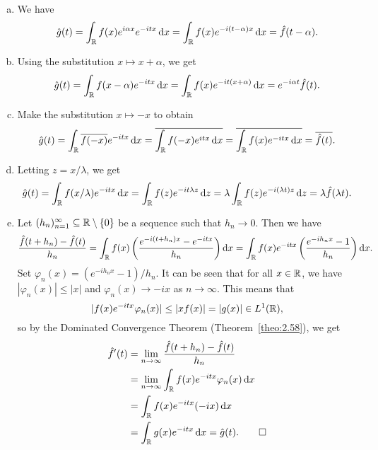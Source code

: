 \begin{pf}~
    \begin{enumerate}[(a)]
        \item We have 
        \[ \hat g(t) = \int_{\mathbb{R}} f(x) e^{i\alpha x} e^{-itx}\,\mathrm{d} x = 
        \int_{\mathbb{R}} f(x) e^{-i(t-\alpha)x}\,\mathrm{d} x = \hat f(t - \alpha). \] 
        \item Using the substitution $x \mapsto x + \alpha$, we get 
        \[ \hat g(t) = \int_{\mathbb{R}} f(x-\alpha) e^{-itx}\,\mathrm{d} x 
        = \int_{\mathbb{R}} f(x) e^{-it(x+\alpha)}\,\mathrm{d} x = e^{-i\alpha t} \hat f(t). \] 
        \item Make the substitution $x \mapsto -x$ to obtain 
        \[ \hat g(t) = \int_{\mathbb{R}} \overline{f(-x)} e^{-itx}\,\mathrm{d} x 
        = \overline{\int_{\mathbb{R}} f(-x) e^{itx}\,\mathrm{d} x} = 
        \overline{\int_{\mathbb{R}} f(x) e^{-itx}\,\mathrm{d} x} = \overline{\hat f(t)}. \] 
        \item Letting $z = x/\lambda$, we get 
        \[ \hat g(t) = \int_{\mathbb{R}} f(x/\lambda) e^{-itx}\,\mathrm{d} x 
        = \int_{\mathbb{R}} f(z) e^{-it\lambda z} \,\mathrm{d} z 
        = \lambda \int_{\mathbb{R}} f(z) e^{-i(\lambda t)z}\,\mathrm{d} z 
        = \lambda \hat f(\lambda t). \] 
        \item Let $(h_n)_{n=1}^\infty \subseteq \mathbb{R} \setminus \{0\}$ be a 
        sequence such that $h_n \to 0$. Then we have 
        \[ \frac{\hat f(t + h_n) - \hat f(t)}{h_n} 
        = \int_{\mathbb{R}} f(x) \left( \frac{e^{-i(t+h_n)x} - e^{-itx}}{h_n} \right) \textrm{d}x 
        = \int_{\mathbb{R}} f(x) e^{-itx} \left( \frac{e^{-ih_nx} - 1}{h_n} \right) \textrm{d}x. \] 
        Set $\varphi_n(x) = (e^{-ih_nx} - 1)/h_n$. It can be seen that 
        for all $x \in \mathbb{R}$, we have $|\varphi_n(x)| \leq |x|$ and 
        $\varphi_n(x) \to -ix$ as $n \to \infty$. This means that 
        \[ |f(x) e^{-itx} \varphi_n(x)| \leq |xf(x)| = |g(x)| \in L^1(\mathbb{R}), \] 
        so by the Dominated Convergence Theorem (Theorem~\ref{theo:2.58}), we get 
        \begin{align*}
            \hat f'(t) 
            &= \lim_{n\to\infty} \frac{\hat f(t + h_n) - \hat f(t)}{h_n} \\
            &= \lim_{n\to\infty} \int_{\mathbb{R}} f(x) e^{-itx} \varphi_n(x)\,\mathrm{d} x \\ 
            &= \int_{\mathbb{R}} f(x) e^{-itx} (-ix)\,\mathrm{d} x \\ 
            &= \int_{\mathbb{R}} g(x) e^{-itx}\,\mathrm{d} x = \hat g(t). \qedhere 
        \end{align*}
    \end{enumerate}
\end{pf}


